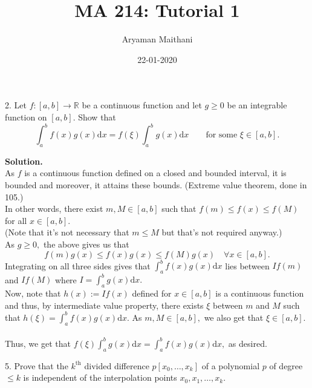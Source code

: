 \documentclass{article}
\title{MA 214: Tutorial 1}
\author{Aryaman Maithani}
\date{22-01-2020}
\begin{document}
\maketitle

2. Let $f:[a, b] \to \mathbb{R}$ be a continuous function and let $g \ge 0$ be an integrable function on $[a, b].$ Show that
\[\int_{a}^{b} f(x)g(x) \text{d}x = f(\xi)\int_{a}^{b} g(x) \text{d}x \qquad \text{for some } \xi \in [a, b].\]

\textbf{Solution.}\\
As $f$ is a continuous function defined on a closed and bounded interval, it is bounded and moreover, it attains these bounds. (Extreme value theorem, done in 105.)\\
In other words, there exist $m, M \in [a, b]$ such that $f(m) \le f(x) \le f(M)$ for all $x \in [a, b].$\\
(Note that it's not necessary that $m \le M$ but that's not required anyway.)\\
As $g \ge 0,$ the above gives us that
\[f(m)g(x) \le f(x)g(x) \le f(M)g(x) \quad \forall x \in [a, b].\]
Integrating on all three sides gives that $\displaystyle\int_{a}^{b} f(x)g(x) \text{d}x$ lies between $If(m)$ and $If(M)$ where $I = \displaystyle\int_{a}^{b} g(x)\text{d}x.$\\
Now, note that $h(x) := If(x)$ defined for $x \in [a, b]$ is a continuous function and thus, by intermediate value property, there exists $\xi$ between $m$ and $M$ such that $h(\xi) = \displaystyle\int_{a}^{b} f(x)g(x) \text{d}x.$ As $m, M \in [a, b],$ we also get that $\xi \in [a, b].$\\~\\
Thus, we get that $\displaystyle f(\xi)\int_{a}^{b} g(x) \text{d}x = \int_{a}^{b} f(x)g(x) \text{d}x,$ as desired.

\hrulefill

5. Prove that the $k^{\text{th}}$ divided difference $p[x_0, \ldots, x_k]$ of a polynomial $p$ of degree $\le k$ is independent of the interpolation points $x_0, x_1, \ldots, x_k.$ \\
\end{document}
